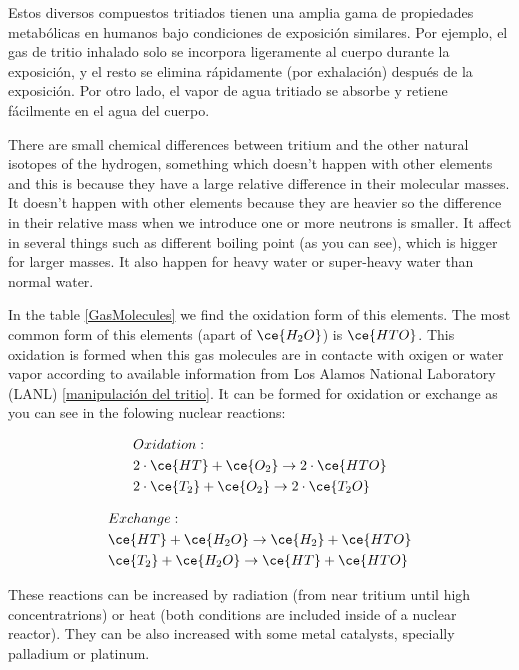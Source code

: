  Estos diversos compuestos tritiados tienen una amplia gama de propiedades metabólicas en humanos bajo condiciones de exposición similares. Por ejemplo, el gas de tritio inhalado solo se incorpora ligeramente al cuerpo durante la exposición, y el resto se elimina rápidamente (por exhalación) después de la exposición. Por otro lado, el vapor de agua tritiado se absorbe y retiene fácilmente en el agua del cuerpo.

There are small chemical differences between tritium and the other natural isotopes of the hydrogen, something which doesn't happen with other elements and this is because they have a large relative difference in their molecular masses. It doesn't happen with other elements because they are heavier so the difference in their relative mass when we introduce one or more neutrons is smaller. It affect in several things such as different boiling point (as you can see), which is higger for larger masses. It also happen for heavy water or super-heavy water than normal water.

In the table \ref{GasMolecules} we find the oxidation form of this elements. The most common form of this elements (apart of $\ce{H_2 O}$) is $\ce{HTO}$. This oxidation is formed when this gas molecules are in contacte with oxigen or water vapor according to available information from Los Alamos National Laboratory (LANL) \ref{manipulación del tritio}.   It can be formed for oxidation or exchange as you can see in the folowing nuclear reactions:

\begin{equation}
\begin{split}
& Oxidation: \\
& 2\cdot{}\ce{HT} + \ce{O_2} \rightarrow 2 \cdot{} \ce{HTO}\\
& 2\cdot{}\ce{T_2} + \ce{O_2} \rightarrow 2 \cdot{} \ce{T_2 O}
\label{oxidation}
\end{split}
\end{equation}

\begin{equation}
\begin{split}
& Exchange: \\
& \ce{HT} + \ce{H_2 O} \rightarrow \ce{H_2} + \ce{HTO}\\
& \ce{T_2} + \ce{H_2 O} \rightarrow \ce{HT} + \ce{HTO}\\
\label{exchange}
\end{split}
\end{equation}

These reactions can be increased by radiation (from near tritium until high concentratrions) or heat (both conditions are included inside of a nuclear reactor). They can be also increased  with some metal catalysts, specially palladium or platinum. 

